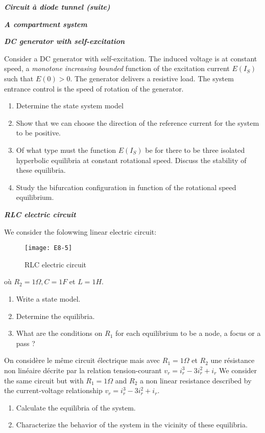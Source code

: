 {\begin{exemple}{\bf \em Circuit {à} diode tunnel (suite)}
\begin{exercice} {\bf \em A compartment system}
\end{exercice}
\vv

\begin{exercice}{\bf \em DC generator with self-excitation}

Consider a DC generator with self-excitation. The induced voltage is at constant speed, a {\em monotone increasing bounded} 
function of  the excitation current $E( I_S)$ such that $E(0)>0$. 
The generator delivers a resistive load. The system entrance control is the speed of rotation of the
generator.

\begin{enumerate}
\item Determine the state system model
\item Show that we can choose the direction of the reference current for the system to be positive.
\item Of what type must the function $E(I_S)$ be for there to be three
isolated hyperbolic equilibria at constant rotational speed. Discuss the stability of these equilibria.
\item Study the bifurcation configuration in function of the rotational speed equilibrium.
\end{enumerate}
\end{exercice}
\vv

\begin{exercice} {\bf \em RLC electric circuit} 

We consider the folowwing linear electric circuit:
\begin{figure}[h] 
   \centering
   \texttt{[image: E8-5]} 
   \caption{RLC electric circuit}
   \label{fig:E8-5}
\end{figure}

où $R_2 = 1\Omega, C = 1F$ et $L = 1H$.

\begin{enumerate}
\item Write a state model.
\item Determine the equilibria.
\item What are the conditions on $R_1$ for each equilibrium to be a
node, a focus or a pass ?
\end{enumerate}

On considère le même circuit électrique mais avec $R_1 = 1\Omega$ et $R_2$ une résistance non
linéaire décrite par la relation tension-courant $v_r = i^3_r - 3i^2_r + i_r$
We consider the same circuit but with $R_1 = 1\Omega$ and $R_2$ a non linear resistance
described by the current-voltage relationship $v_r = i^3_r - 3i^2_r + i_r$.
\begin{enumerate}
\item Calculate the equilibria of the system.
\item Characterize the behavior of the system in the vicinity of these equilibria.
\end{enumerate}
\end{exercice}
\vv 


\end{exemple}}
